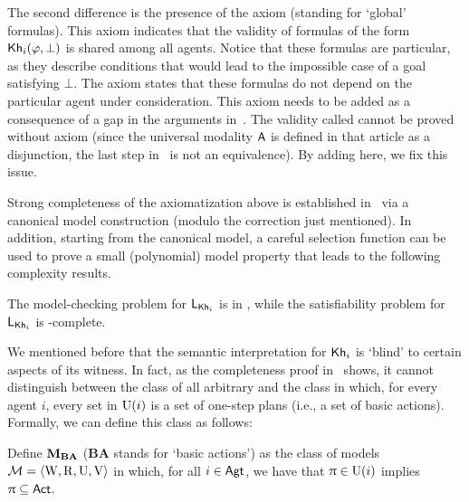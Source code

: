 \begin{mrevised}The second difference  is the presence of the axiom  (standing for `global' formulas).  This axiom indicates that the validity of formulas of the form ${\sf Kh}_i(\varphi,\bot)$ is shared among all agents.  Notice that these formulas are particular, as they describe conditions that would lead to the impossible case of a goal satisfying $\bot$.  The axiom states that these formulas do not depend on the particular agent under consideration. 
This axiom needs to be added as a consequence of a gap in the arguments  in~\cite[Prop.~4]{AFSVQ23report}. The validity called  cannot be proved without axiom  (since the universal modality ${\sf A}$ is defined in that article as a disjunction, the last step in~\cite[Prop.~4]{AFSVQ23report} is not an equivalence). By adding  here, we fix this issue.
\end{mrevised}


Strong completeness of the axiomatization above is established in~\cite{AFSVQ21,AFSVQ23report} via a canonical model construction (modulo the correction just mentioned). In addition, starting from the canonical model, a careful selection function can be used to prove a small (polynomial) model property that leads to the following complexity results.

\medskip 

\begin{theorem}
    The model-checking problem for $\mathsf{L}_{{\sf Kh}_i}$ is in \Poly, while the satisfiability problem for $\mathsf{L}_{{\sf Kh}_i}$ is \NP-complete.
\end{theorem}


\medskip

We mentioned before that the semantic interpretation for ${\sf Kh}_i$ is `blind' to certain aspects of its witness. In fact, as the completeness proof in~\cite{AFSVQ21} shows, it cannot distinguish between the class of all arbitrary \ults and the class in which, for every agent $i$, every set in $\operatorname{U}(i)$ is a set of one-step plans (i.e., a set of basic actions). Formally, we can define this class as follows: 
\medskip 

\begin{definition}\label{def:class-m-one}
	Define $\mathbf{M}_{\mathbf{BA}}$ (\textbf{BA} stands for `basic actions') as the class of models $\mathcal{M} = \langle \operatorname{W}, \operatorname{R}, \operatorname{U}, \operatorname{V} \rangle$ in which, for all $i \in {\rm \sf Agt}$, we have that $\uppi \in \operatorname{U}(i)$ implies $\uppi \subseteq {\rm \sf Act}$.
\end{definition}

